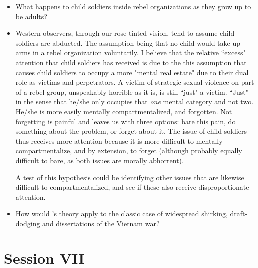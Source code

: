 \documentclass[12pt]{article}
\begin{document}
\begin{itemize}

	\item What happens to child soldiers inside rebel organizations as they
		grow up to be adults?

	\item Western observers, through our rose tinted vision, tend to assume
		child soldiers are abducted. The assumption being that no child
		would take up arms in a rebel organization voluntarily. I
		believe that the relative ``excess" attention that child
		soldiers has received is due to the this assumption that causes
		child soldiers to occupy a more "mental real estate" due to
		their dual role as victims and perpetrators. A victim of
		strategic sexual violence on part of a rebel group, unspeakably
		horrible as it is, is still ``just" a victim.  ``Just" in the
		sense that he/she only occupies that \textit{one} mental
		category and not two. He/she is more easily mentally
		compartmentalized, and forgotten. Not forgetting is painful and
		leaves us with three options: bare this pain, do something about
		the problem, or forget about it. The issue of child soldiers
		thus receives more attention because it is more difficult to
		mentally compartmentalize, and by extension, to forget (although
		probably equally difficult to bare, as both issues are morally
		abhorrent).

		A test of this hypothesis could be identifying other issues that
		are likewise difficult to compartmentalized, and see if these
		also receive disproportionate attention.

	\item How would \citet{Manekin_2017}'s theory apply to the classic case
		of widespread shirking, draft-dodging and dissertations of the
		Vietnam war?

\end{itemize}

\section*{Session VII}
\end{document}
